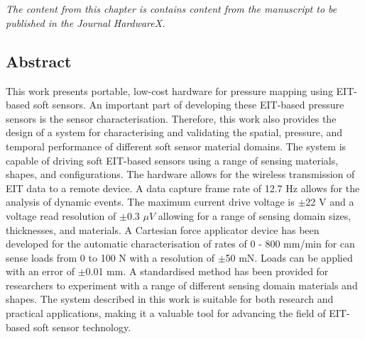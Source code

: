 \chapter{\chapviiiname}
\label{chapter8}
\textit{The content from this chapter is contains content from the manuscript to be published in the Journal HardwareX.}


\section{Abstract}
This work presents portable, low-cost hardware for pressure mapping using EIT-based soft sensors. An important part of developing these EIT-based pressure sensors is the sensor characterisation. Therefore, this work also provides the design of a system for characterising and validating the spatial, pressure, and temporal performance of different soft sensor material domains. The system is capable of driving soft EIT-based sensors using a range of sensing materials, shapes, and configurations. The hardware allows for the wireless transmission of EIT data to a remote device. 
A data capture frame rate of 12.7 Hz allows for the analysis of dynamic events. The maximum current drive voltage is $\pm$22 V and a voltage read resolution of $\pm$0.3 $\mu V$ allowing for a range of sensing domain sizes, thicknesses, and materials. A Cartesian force applicator device has been developed for the automatic characterisation of rates of 0 - 800 mm/min for can sense loads from 0 to 100 N with a resolution of $\pm$50 mN. Loads can be applied with an error of $\pm$0.01 mm. A standardised method has been provided for researchers to experiment with a range of different sensing domain materials and shapes. The system described in this work is suitable for both research and practical applications, making it a valuable tool for advancing the field of EIT-based soft sensor technology.


